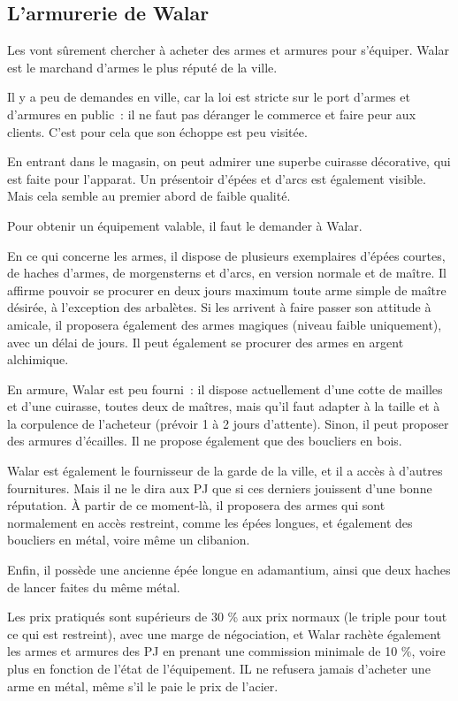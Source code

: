 \documentclass[a4paper,10pt,openany]{book}
\begin{document}
\begin{multicols}{2}
\subsection{L’armurerie de Walar}
Les \PJs vont sûrement chercher à acheter des armes et armures pour s’équiper. Walar est le marchand d’armes le plus réputé de la ville.\par Il y a
peu de demandes en ville, car la loi est stricte sur le port d’armes et d’armures en public : il ne faut pas déranger le commerce et faire peur aux
clients. C’est pour cela que son échoppe est peu visitée.\par En entrant dans le magasin, on peut admirer une superbe cuirasse décorative, qui est
faite pour l’apparat. Un présentoir d’épées et d’arcs est également visible. Mais cela semble au premier abord de faible qualité.\par Pour obtenir un
équipement valable, il faut le demander à Walar.\par En ce qui concerne les armes, il dispose de plusieurs exemplaires d’épées courtes, de haches
d’armes, de morgensterns et d’arcs, en version normale et de maître. Il affirme pouvoir se procurer en deux jours maximum toute arme simple de maître
désirée, à l’exception des arbalètes. Si les \PJs arrivent à faire passer son attitude à amicale, il proposera également des armes magiques (niveau
faible uniquement), avec un délai de  jours. Il peut également se procurer des armes en argent alchimique.\par En armure, Walar est peu
fourni : il dispose actuellement d’une cotte de mailles et d’une cuirasse, toutes deux de maîtres, mais qu’il faut adapter à la taille et à la
corpulence de l’acheteur (prévoir 1 à 2 jours d’attente). Sinon, il peut proposer des armures d’écailles. Il ne propose également que des boucliers
en bois.\par Walar est également le fournisseur de la garde de la ville, et il a accès à d’autres fournitures. Mais il ne le dira aux PJ que si ces
derniers jouissent d’une bonne réputation. À partir de ce moment-là, il proposera des armes qui sont normalement en accès restreint, comme les
épées longues, et également des boucliers en métal, voire même un clibanion.\par
Enfin, il possède une ancienne épée longue en adamantium, ainsi que deux haches de lancer faites du même métal.\par Les prix pratiqués sont supérieurs
de 30 \% aux prix normaux (le triple pour tout ce qui est restreint), avec une marge de négociation, et Walar rachète également les armes et armures
des PJ en prenant une commission minimale de 10 \%, voire plus en fonction de l’état de l’équipement. IL ne refusera jamais d’acheter une arme en
métal, même s’il le paie le prix de l’acier.

\end{multicols}
\end{document}
